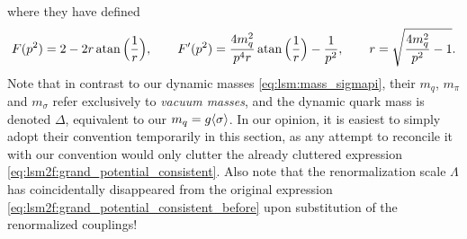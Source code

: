 where they have defined
\begin{equation}
	F(p^2) = 2 - 2 r \operatorname{atan} \Big(\frac1r\Big), \qquad
	F'(p^2) = \frac{4 m_q^2}{p^4 r} \operatorname{atan} \Big(\frac1r\Big) - \frac{1}{p^2}, \qquad
	r = \sqrt{\frac{4 m_q^2}{p^2}-1} .
\end{equation}
Note that in contrast to our dynamic masses \eqref{eq:lsm:mass_sigmapi},
their $m_q$, $m_\pi$ and $m_\sigma$ refer exclusively to \emph{vacuum masses},
and the dynamic quark mass is denoted $\Delta$, equivalent to our $m_q=g\langle \sigma \rangle$.
In our opinion, it is easiest to simply adopt their convention temporarily in this section,
as any attempt to reconcile it with our convention
would only clutter the already cluttered expression \eqref{eq:lsm2f:grand_potential_consistent}.
Also note that the renormalization scale $\Lambda$ has coincidentally disappeared from the original expression \eqref{eq:lsm2f:grand_potential_consistent_before} upon substitution of the renormalized couplings!

